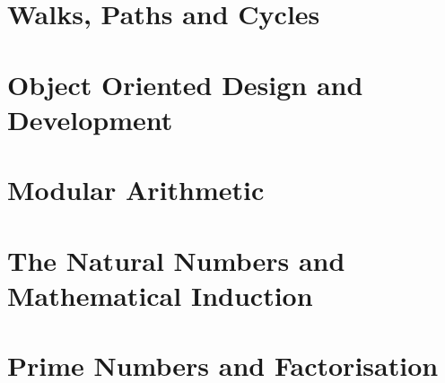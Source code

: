 \section{Walks, Paths and Cycles}
\label{sec:WalksPathsCycles}
\lipsum[1]

\section{Object Oriented Design and Development}
\label{chap:ObjectOrientedDesignandDevelopment}
\lipsum[1]

\section{Modular Arithmetic}
\label{chap:ModularArithmetic}

\section{The Natural Numbers and Mathematical Induction}
\label{chap:NaturalNumbersAndMathematicalInduction}

\section{Prime Numbers and Factorisation}
\label{sec:PrimeNumbersAndFactorisation}

